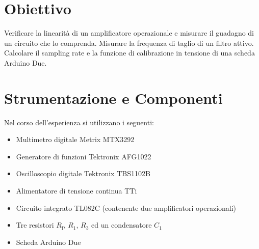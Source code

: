 \documentclass[a4paper,11pt]{article} %
\begin{document}
\section{Obiettivo}
Verificare la linearità di un amplificatore operazionale e misurare il guadagno di un circuito che lo comprenda.
Misurare la frequenza di taglio di un filtro attivo. Calcolare il sampling rate e la funzione di calibrazione in
tensione di una scheda Arduino Due.


\section{Strumentazione e Componenti}\label{s:strumenti}
Nel corso dell'esperienza si utilizzano i seguenti:
\begin{itemize}
	\item Multimetro digitale Metrix MTX3292
	\item Generatore di funzioni Tektronix AFG1022
	\item Oscilloscopio digitale Tektronix TBS1102B
	\item Alimentatore di tensione continua TTi
	\item Circuito integrato TL082C (contenente due amplificatori operazionali)
	\item Tre resistori $R_{\text{f}}$, $R_{1}$, $R_{3}$ ed un condensatore $C_{1}$ 
	\item Scheda Arduino Due
\end{itemize}
\end{document}
